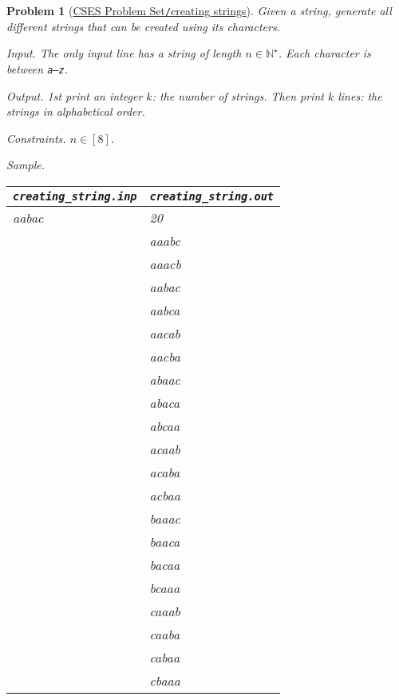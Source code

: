\documentclass{article}
\newtheorem{problem}{Problem}
\begin{document}
\begin{problem}[\href{https://cses.fi/problemset/task/1622}{CSES Problem Set{\tt/}creating strings}]
    Given a string, generate all different strings that can be created using its characters.
    \item {\sf Input.} The only input line has a string of length $n\in\mathbb{N}^\star$. Each character is between {\tt a--z}.
    \item {\sf Output.} 1st print an integer $k$: the number of strings. Then print $k$ lines: the strings in alphabetical order.
    \item {\sf Constraints.} $n\in[8]$.
    \item {\sf Sample.}
    \begin{table}[H]
        \centering
        \begin{tabular}{|l|l|}
            \hline
            \verb|creating_string.inp| & \verb|creating_string.out| \\
            \hline
            aabac & 20 \\
            & aaabc \\
            & aaacb \\
            & aabac \\
            & aabca \\
            & aacab \\
            & aacba \\
            & abaac \\
            & abaca \\
            & abcaa \\
            & acaab \\
            & acaba \\
            & acbaa \\
            & baaac \\
            & baaca \\
            & bacaa \\
            & bcaaa \\
            & caaab \\
            & caaba \\
            & cabaa \\
            & cbaaa \\
            \hline
        \end{tabular}
    \end{table}
\end{problem}
\end{document}
